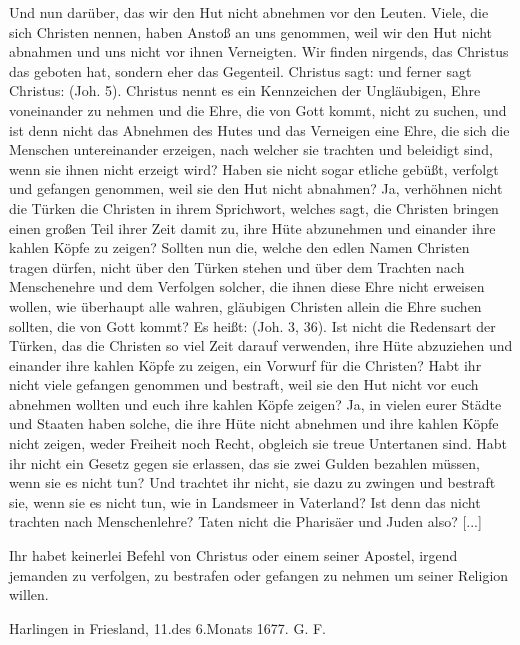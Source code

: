 {  Und nun darüber, das wir den Hut nicht abnehmen vor den
  Leuten. Viele, die sich Christen nennen, haben Anstoß an uns 
  genommen, weil wir den Hut nicht abnahmen und uns nicht vor
  ihnen Verneigten. Wir finden nirgends, das Christus das geboten
  hat, sondern eher das Gegenteil. Christus sagt:  und ferner sagt Christus:  (Joh. 5). Christus nennt
  es ein Kennzeichen der Ungläubigen, Ehre voneinander zu nehmen
  und die Ehre, die von Gott kommt, nicht zu suchen, und ist denn
  nicht das Abnehmen des Hutes und das Verneigen eine Ehre, die
  sich die Menschen untereinander erzeigen, nach welcher sie trachten
  und beleidigt sind, wenn sie ihnen nicht erzeigt wird? Haben sie
  nicht sogar etliche gebüßt, verfolgt und gefangen genommen, weil
  sie den Hut nicht abnahmen? Ja, verhöhnen nicht die Türken
  die Christen in ihrem Sprichwort, welches sagt, die Christen
  bringen einen großen Teil ihrer Zeit damit zu, ihre Hüte 
  abzunehmen und einander ihre kahlen Köpfe zu zeigen? Sollten nun
  die, welche den edlen Namen Christen tragen dürfen, nicht über
  den Türken stehen und über dem Trachten nach Menschenehre
  und dem Verfolgen solcher, die ihnen diese Ehre nicht erweisen
  wollen, wie überhaupt alle wahren, gläubigen Christen allein die
  Ehre suchen sollten, die von Gott kommt? Es heißt:  (Joh. 3, 36). 
  Ist nicht die Redensart der Türken, das die Christen so viel Zeit
  darauf verwenden, ihre Hüte abzuziehen und einander ihre kahlen
  Köpfe zu zeigen, ein Vorwurf für die Christen? Habt ihr nicht
  viele gefangen genommen und bestraft, weil sie den Hut nicht vor
  euch abnehmen wollten und euch ihre kahlen Köpfe zeigen? Ja,
  in vielen eurer Städte und Staaten haben solche, die ihre Hüte
  nicht abnehmen und ihre kahlen Köpfe nicht zeigen, weder Freiheit
  noch Recht, obgleich sie treue Untertanen sind. Habt ihr nicht
  ein Gesetz gegen sie erlassen, das sie zwei Gulden bezahlen müssen,
  wenn sie es nicht tun? Und trachtet ihr nicht, sie dazu zu zwingen
  und bestraft sie, wenn sie es nicht tun, wie in Landsmeer in
  Vaterland? Ist denn das nicht trachten nach Menschenlehre?
  Taten nicht die Pharisäer und Juden also? [...]

  Ihr habet keinerlei Befehl von Christus oder einem seiner
  Apostel, irgend jemanden zu verfolgen, 
  zu bestrafen oder gefangen
  zu nehmen um seiner Religion willen.

  \begin{flushright} Harlingen in 
  Friesland, 11.des 6.Monats 
  1677. G. F.\end{flushright}
}

